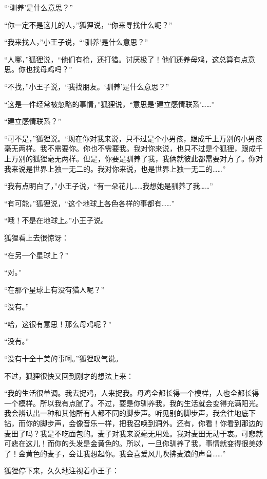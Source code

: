 “‘驯养'是什么意思？”

“你一定不是这儿的人，”狐狸说，“你来寻找什么呢？”

“我来找人，”小王子说，“‘驯养'是什么意思？”

“人哪，”狐狸说，“他们有枪，还打猎。讨厌极了！他们还养母鸡，这总算有点意思。你也找母鸡吗？”

“不找，”小王子说，“我找朋友。‘驯养'是什么意思？”

“这是一件经常被忽略的事情，”狐狸说，“意思是‘建立感情联系'\ldots{}\ldots{}”

“建立感情联系？”

“可不是，”狐狸说。“现在你对我来说，只不过是个小男孩，跟成千上万别的小男孩毫无两样。我不需要你。你也不需要我。我对你来说，也只不过是个狐狸，跟成千上万别的狐狸毫无两样。但是，你要是驯养了我，我俩就彼此都需要对方了。你对我来说是世界上独一无二的。我对你来说，也是世界上独一无二的\ldots{}\ldots{}”

“我有点明白了，”小王子说，“有一朵花儿\ldots{}\ldots{}我想她是驯养了我\ldots{}\ldots{}”

“有可能，”狐狸说，“这个地球上各色各样的事都有\ldots{}\ldots{}”

“哦！不是在地球上。”小王子说。

狐狸看上去很惊讶：

“在另一个星球上？”

“对。”

“在那个星球上有没有猎人呢？”

“没有。”

“哈，这很有意思！那么母鸡呢？”

“没有。”

“没有十全十美的事呵。”狐狸叹气说。

不过，狐狸很快又回到刚才的想法上来：

“我的生活很单调。我去捉鸡，人来捉我。母鸡全都长得一个模样，人也全都长得一个模样。所以我有点腻了。不过，要是你驯养我，我的生活就会变得充满阳光。我会辨认出一种和其他所有人都不同的脚步声。听见别的脚步声，我会往地底下钻，而你的脚步声，会像音乐一样，把我召唤到洞外。还有，你看！你看到那边的麦田了吗？我是不吃面包的。麦子对我来说毫无用处。我对麦田无动于衷。可悲就可悲在这儿！而你的头发是金黄色的。所以，一旦你驯养了我，事情就变得很美妙了！金黄色的麦子，会让我想起你。我会喜爱风儿吹拂麦浪的声音\ldots{}\ldots{}”

狐狸停下来，久久地注视着小王子：

{\startalignment[center]
 \stopalignment}

